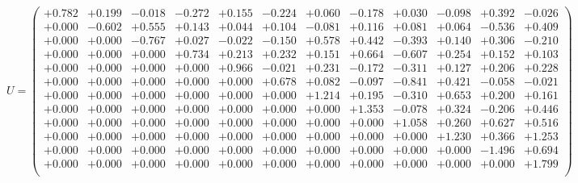 \documentclass[9pt]{article}
\theoremstyle{plain}
\theoremstyle{definition}
\theoremstyle{remark}
\numberwithin{equation}{section}
\begin{document}
$U = \left(
\begin{array}{
cccccccccccc}
+0.782 & +0.199 & -0.018 & -0.272 & +0.155 & -0.224 & +0.060 & -0.178 & +0.030 & -0.098 & +0.392 & -0.026 \\
+0.000 & -0.602 & +0.555 & +0.143 & +0.044 & +0.104 & -0.081 & +0.116 & +0.081 & +0.064 & -0.536 & +0.409 \\
+0.000 & +0.000 & -0.767 & +0.027 & -0.022 & -0.150 & +0.578 & +0.442 & -0.393 & +0.140 & +0.306 & -0.210 \\
+0.000 & +0.000 & +0.000 & +0.734 & +0.213 & +0.232 & +0.151 & +0.664 & -0.607 & +0.254 & +0.152 & +0.103 \\
+0.000 & +0.000 & +0.000 & +0.000 & +0.966 & -0.021 & +0.231 & -0.172 & -0.311 & +0.127 & +0.206 & +0.228 \\
+0.000 & +0.000 & +0.000 & +0.000 & +0.000 & +0.678 & +0.082 & -0.097 & -0.841 & +0.421 & -0.058 & -0.021 \\
+0.000 & +0.000 & +0.000 & +0.000 & +0.000 & +0.000 & +1.214 & +0.195 & -0.310 & +0.653 & +0.200 & +0.161 \\
+0.000 & +0.000 & +0.000 & +0.000 & +0.000 & +0.000 & +0.000 & +1.353 & -0.078 & +0.324 & -0.206 & +0.446 \\
+0.000 & +0.000 & +0.000 & +0.000 & +0.000 & +0.000 & +0.000 & +0.000 & +1.058 & +0.260 & +0.627 & +0.516 \\
+0.000 & +0.000 & +0.000 & +0.000 & +0.000 & +0.000 & +0.000 & +0.000 & +0.000 & +1.230 & +0.366 & +1.253 \\
+0.000 & +0.000 & +0.000 & +0.000 & +0.000 & +0.000 & +0.000 & +0.000 & +0.000 & +0.000 & -1.496 & +0.694 \\
+0.000 & +0.000 & +0.000 & +0.000 & +0.000 & +0.000 & +0.000 & +0.000 & +0.000 & +0.000 & +0.000 & +1.799 \\
\end{array}
\right)$ \newline 
\end{document}
